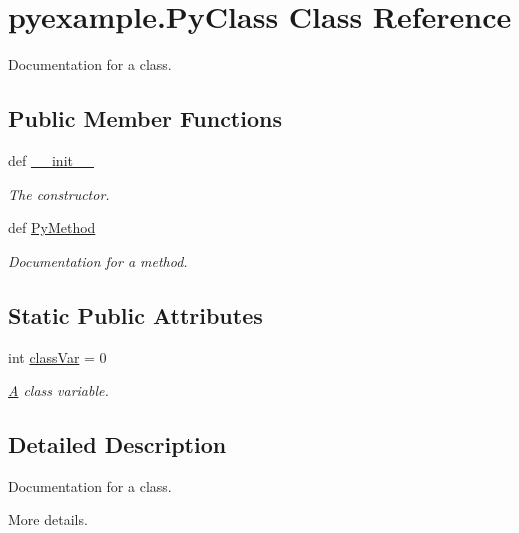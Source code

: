 \hypertarget{classpyexample_1_1PyClass}{\section{pyexample.\-Py\-Class Class Reference}
\label{classpyexample_1_1PyClass}
}


Documentation for a class.  


\subsection*{Public Member Functions}
\begin{DoxyCompactItemize}
\item 
def \hyperlink{classpyexample_1_1PyClass_aa030fc201e82d9ac3fdb3e8afda712cc}{\-\_\-\-\_\-init\-\_\-\-\_\-}
\begin{DoxyCompactList}\small\item\em The constructor. \end{DoxyCompactList}\item 
def \hyperlink{classpyexample_1_1PyClass_aa60932a2e75f67ddbe84dda601be6327}{Py\-Method}
\begin{DoxyCompactList}\small\item\em Documentation for a method. \end{DoxyCompactList}\end{DoxyCompactItemize}
\subsection*{Static Public Attributes}
\begin{DoxyCompactItemize}
\item 
int \hyperlink{classpyexample_1_1PyClass_abd17aff54e5b0ca194020c796c733546}{class\-Var} = 0
\begin{DoxyCompactList}\small\item\em \hyperlink{classA}{A} class variable. \end{DoxyCompactList}\end{DoxyCompactItemize}


\subsection{Detailed Description}
Documentation for a class. 

More details. 


